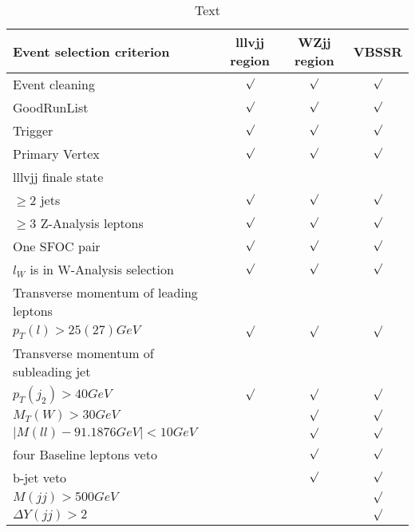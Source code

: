 \documentclass[../Bachelorarbeit.tex]{subfiles}
\begin{document}
\begin{table}[h]
    \begin{tabular}{  l c c c }
        \hline
        Event selection criterion & lllvjj region & WZjj region & VBSSR\\
        \hline
        Event cleaning & $\surd$ & $\surd$ & $\surd$ \\
        GoodRunList & $\surd$ & $\surd$ & $\surd$ \\
        Trigger & $\surd$ & $\surd$ & $\surd$ \\
        Primary Vertex & $\surd$ & $\surd$ & $\surd$ \\
        lllvjj finale state & & & \\
        $\geq 2$ jets & $\surd$ & $\surd$ & $\surd$ \\
        $\geq 3$ Z-Analysis leptons & $\surd$ & $\surd$ & $\surd$ \\
        One SFOC pair & $\surd$ & $\surd$ & $\surd$ \\
        $l_{W}$ is in W-Analysis selection & $\surd$ & $\surd$ & $\surd$ \\
        Transverse momentum of leading leptons & & & \\
        $p_{T}(l)>25(27) GeV$ & $\surd$ & $\surd$ & $\surd$ \\
        Transverse momentum of subleading jet & & & \\
        $p_{T}(j_{2})>40 GeV$ & $\surd$ & $\surd$ & $\surd$ \\
        \hline
        $M_{T}(W)>30 GeV$ & & $\surd$ & $\surd$ \\
        $\lvert M(ll)-91.1876 GeV\rvert < 10 GeV$ & & $\surd$ & $\surd$ \\
        four Baseline leptons veto & & $\surd$ & $\surd$ \\
        b-jet veto & & $\surd$ & $\surd$ \\
        \hline
        $M(jj)>500 GeV$ & & & $\surd$ \\
        $\Delta Y(jj) >2$ & & & $\surd$ \\
        \hline
    \end{tabular}
    \centering
    \caption{Text \cite{Bittrich.27.05.2020}}
    \label{tab:eventselection}
\end{table}
\end{document}
